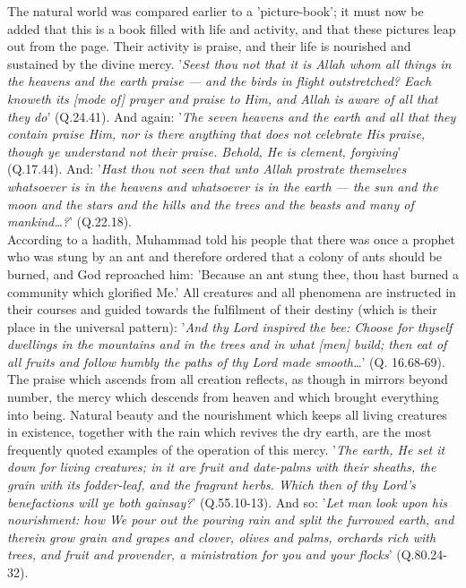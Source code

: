 \documentclass[11pt, b5paper, twoside]{book}
\begin{document}
The natural world was compared earlier to a 'picture-book'; it must now be added that this is a book 
filled with life and activity, and that these pictures leap out from the page. Their activity is 
praise, and their life is nourished and sustained by the divine mercy. '\emph{Seest thou not that it is 
Allah whom all things in the heavens and the earth praise --- and the birds in flight outstretched? 
Each knoweth its [mode of] prayer and praise to Him, and Allah is aware of all that they 
do}' (Q.24.41). And again: '\emph{The seven heavens and the earth and all that they contain praise Him, nor is there anything that does not celebrate His praise, though ye understand not their praise. Behold, 
He is clement, forgiving}' (Q.17.44). And: '\emph{Hast thou not seen that unto Allah prostrate themselves 
whatsoever is in the heavens and whatsoever is in the earth --- the sun and the moon and the stars and 
the hills and the trees and the beasts and many of mankind\ldots{}?}' (Q.22.18). \\

According to a hadith, Muhammad told his people that there was once a prophet who was stung by an ant 
and therefore ordered that a colony of ants should be burned, and God reproached him: 'Because an ant 
stung thee, thou hast burned a community which glorified Me.' All creatures and all phenomena are 
instructed in their courses and guided towards the fulfilment of their destiny (which is their place 
in the universal pattern): '\emph{And thy Lord inspired the bee: Choose for thyself dwellings in the 
mountains and in the trees and in what [men] build; then eat of all fruits and follow humbly the 
paths of thy Lord made smooth\ldots{}}' (Q. 16.68-69). \\

The praise which ascends from all creation reflects, as though in mirrors beyond number, the mercy 
which descends from heaven and which brought everything into being. Natural beauty and the 
nourishment which keeps all living creatures in existence, together with the rain which revives the 
dry earth, are the most frequently quoted examples of the operation of this mercy. '\emph{The earth, He set it down for living creatures; in it are fruit and date-palms with their sheaths, the grain with its 
fodder-leaf, and the fragrant herbs. Which then of thy Lord's benefactions will ye both 
gainsay?}' (Q.55.10-13). And so: '\emph{Let man look upon his nourishment: how We pour out the pouring rain and split the furrowed earth, and therein grow grain and grapes and clover, olives and palms, 
orchards rich with trees, and fruit and provender, a ministration for you and your flocks}' (Q.80.24-
32). \\
\end{document}
